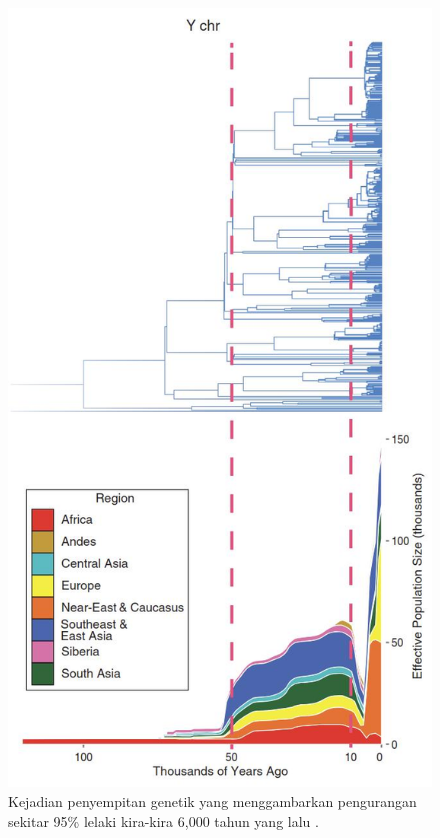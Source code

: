 \documentclass[10pt,twocolumn,letterpaper]{article}
\begin{document}
\begin{figure}[b]

\begin{center}
   \includegraphics[width=1\linewidth]{bottleneck.jpg}
\end{center}
   \caption{Kejadian penyempitan genetik yang menggambarkan pengurangan sekitar 95\% lelaki kira-kira 6,000 tahun yang lalu \cite{62}.}
\label{fig:10}
\label{fig:onecol}
\end{figure}
\end{document}
